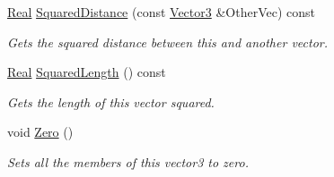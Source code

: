 \begin{DoxyCompactItemize}
\hyperlink{namespaceMezzanine_a726731b1a7df72bf3583e4a97282c6f6}{Real} \hyperlink{classMezzanine_1_1Vector3_af3155cfb3ca49636402f264c199b1d8a}{SquaredDistance} (const \hyperlink{classMezzanine_1_1Vector3}{Vector3} \&OtherVec) const 
\begin{DoxyCompactList}\small\item\em Gets the squared distance between this and another vector. \item\end{DoxyCompactList}\item 
\hyperlink{namespaceMezzanine_a726731b1a7df72bf3583e4a97282c6f6}{Real} \hyperlink{classMezzanine_1_1Vector3_aa061677753dc75d6ea8d4a81f9f0f938}{SquaredLength} () const 
\begin{DoxyCompactList}\small\item\em Gets the length of this vector squared. \item\end{DoxyCompactList}\item 
\hypertarget{classMezzanine_1_1Vector3_a54952c457428bbcb13e02972c205962f}{
void \hyperlink{classMezzanine_1_1Vector3_a54952c457428bbcb13e02972c205962f}{Zero} ()}
\label{classMezzanine_1_1Vector3_a54952c457428bbcb13e02972c205962f}

\begin{DoxyCompactList}\small\item\em Sets all the members of this vector3 to zero. \item\end{DoxyCompactList}\end{DoxyCompactItemize}
